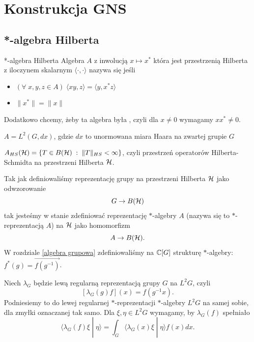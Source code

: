 \chapter{Konstrukcja GNS}

\section{*-algebra Hilberta}

\begin{definition}{*-algebra Hilberta}{}
  Algebra $A$ z inwolucją $x\mapsto x^*$ która jest przestrzenią Hilberta z iloczynem skalarnym $\langle \cdot,\cdot\rangle$ nazywa się  jeśli 
  \begin{itemize}
    \item $(\forall\;x,y,z\in A)\;\langle xy, z\rangle=\langle y, x^*z\rangle$
    \item $\|x^*\|=\|x\|$
  \end{itemize}
  Dodatkowo chcemy, żeby ta algebra była , czyli dla $x\neq 0$ wymagamy $xx^*\neq 0$.
\end{definition}

\begin{example}[m]
  \item $A=L^2(G, dx)$, gdzie $dx$ to unormowana miara Haara na zwartej grupie $G$
  \item $A_{HS}(\operatorname{\mathcal{H}})=\{T\in B(\operatorname{\mathcal{H}})\;:\;\|T\|_{HS}<\infty\}$, czyli przestrzeń operatorów Hilberta-Schmidta na przestrzeni Hilberta $\operatorname{\mathcal{H}}$.
\end{example}

Tak jak definiowaliśmy reprezentację grupy na przestrzeni Hilberta $\operatorname{\mathcal{H}}$ jako odwzorowanie
$$G\to B(\operatorname{\mathcal{H}})$$
tak jesteśmy w stanie zdefiniować reprezentację $*$-algebry $A$ (nazywa się to $*$-reprezentacją $A$) na $\operatorname{\mathcal{H}}$ jako homomorfizm
$$A\to B(\operatorname{\mathcal{H}}).$$
W rozdziale \ref{algebra grupowa} zdefiniowaliśmy na $\mathbb{C}[G]$ strukturę $*$-algebry: $f^*(g)=\vec{f(g^{-1})}$.

Niech $\lambda_G$ będzie lewą regularną reprezentacją grupy $G$ na $L^2G$, czyli
$$[\lambda_G(g)f](x)=f(g^{-1}x).$$
Podniesiemy to do lewej regularnej $*$-reprezentacji $*$-algebry $L^2G$ na samej sobie, dla zmyłki oznaczanej tak samo. Dla $\xi,\eta\in L^2G$ wymagamy, by $\lambda_G(f)$ spełniało
$$\langle \lambda_G(f)\xi\;|\;\eta\rangle=\int_G\langle \lambda_G(x)\xi\;|\;\eta\rangle f(x)dx.$$

